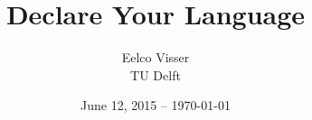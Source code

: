 \title{Declare Your Language}
	
\author{Eelco Visser\\[20pt]TU Delft}
	
\date{June 12, 2015 -- \today}
	


\newpage


%

\newpage


% 

% 
% 


% 
% 
	